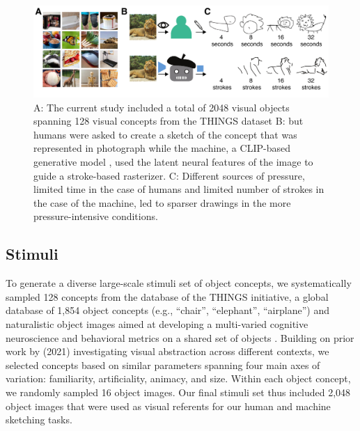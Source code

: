 \documentclass[10pt,letterpaper]{article}
\begin{document}

\begin{figure}
    \centering
    \includegraphics[width= 1\linewidth]{figures/VAB_task.pdf}
 
    \caption{A: The current study included a total of 2048 visual objects spanning 128 visual concepts from the THINGS dataset \cite{hebart2019things} B:
    but humans were asked to create a sketch of the concept that was represented in photograph while the machine, a CLIP-based generative model \cite{vinker2022clipasso}, used the latent neural features of the image to guide a stroke-based rasterizer. C: Different sources of pressure, limited time in the case of humans and limited number of strokes in the case of the machine, led to sparser drawings in the more pressure-intensive conditions.}

    \label{fig:trial}
\end{figure}

\subsection{Stimuli}
To generate a diverse large-scale stimuli set of object concepts, we systematically sampled 128 concepts from the database of the THINGS initiative, a global database of 1,854 object concepts (e.g., ``chair'', ``elephant'', ``airplane'') and naturalistic object images aimed at developing a multi-varied cognitive neuroscience and behavioral metrics on a shared set of objects \cite{hebart2019things}. 
Building on prior work by \citeauthor{yang2021visual} (2021) investigating visual abstraction across different contexts, we selected concepts based on similar parameters spanning four main axes of variation: familiarity, artificiality, animacy, and size. 
Within each object concept, we randomly sampled 16 object images. 
Our final stimuli set thus included 2,048 object images that were used as visual referents for our human and machine sketching tasks.
\end{document}
